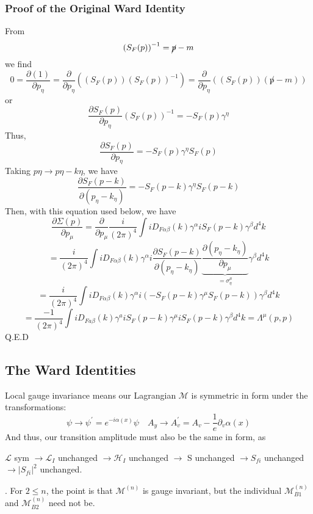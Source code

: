 \subsubsection{Proof of the Original Ward Identity}
From 
$$
\left(S_{F}(p)\right)^{-1}=\cancel{p}-m
$$
we find 
$$
0=\frac{\partial(1)}{\partial p_{\eta}}=\frac{\partial}{\partial p_{\eta}}\left(\left(S_{F}(p)\right)\left(S_{F}(p)\right)^{-1}\right)=\frac{\partial}{\partial p_{\eta}}\left(\left(S_{F}(p)\right)(\not p-m)\right)
$$
or
$$
\frac{\partial S_{F}(p)}{\partial p_{\eta}}\left(S_{F}(p)\right)^{-1}=-S_{F}(p) \gamma^{\eta}
$$
Thus,
$$\frac{\partial S_{F}(p)}{\partial p_{\eta}}=-S_{F}(p) \gamma^{\eta} S_{F}(p)$$
Taking $p \eta \rightarrow p \eta-k \eta$, we have
$$\frac{\partial S_{F}(p-k)}{\partial\left(p_{\eta}-k_{\eta}\right)}=-S_{F}(p-k) \gamma^{\eta} S_{F}(p-k)$$
Then, with this equation used below, we have
$$\frac{\partial \Sigma(p)}{\partial p_{\mu}}=\frac{\partial}{\partial p_{\mu}} \frac{i}{(2 \pi)^{4}} \int i D_{F \alpha \beta}(k) \gamma^{\alpha} i S_{F}(p-k) \gamma^{\beta} d^{4} k$$
$$=\frac{i}{(2 \pi)^{4}} \int i D_{F \alpha \beta}(k) \gamma^{\alpha} i \frac{\partial S_{F}(p-k)}{\partial\left(p_{\eta}-k_{\eta}\right)} \underbrace{\frac{\partial\left(p_{\eta}-k_{\eta}\right)}{\partial p_{\mu}}}_{=\sigma_{\eta}^{\mu}} \gamma^{\beta} d^{4} k$$
$$=\frac{i}{(2 \pi)^{4}} \int i D_{F \alpha \beta}(k) \gamma^{\alpha} i\left(-S_{F}(p-k) \gamma^{\mu} S_{F}(p-k)\right) \gamma^{\beta} d^{4} k$$
$$=\frac{-1}{(2 \pi)^{4}} \int i D_{F a \beta}(k) \gamma^{a} i S_{F}(p-k) \gamma^{\mu} i S_{F}(p-k) \gamma^{\beta} d^{4} k=\Lambda^{\mu}(p, p)$$
Q.E.D

\subsection{The Ward Identities}
Local gauge invariance means our Lagrangian $\mathcal{M}$ is symmetric in form under the transformations:
$$\psi \rightarrow \psi^{\prime}=e^{-i \alpha(x)} \psi \quad A_{y} \rightarrow A_{v}^{\prime}=A_{v}-\frac{1}{e} \partial_{v} \alpha(x)$$
And thus, our transition amplitude must also be the same in form, as

$\mathcal{L}$ sym $\rightarrow \mathcal{L}_{I}$ unchanged $\rightarrow \mathcal{H}_{I}$ unchanged $\rightarrow$ S unchanged $\rightarrow S_{f i}$ unchanged $\rightarrow\left|S_{f i}\right|^{2}$ unchanged.

. For $2\leq n$, the point is that $\mathcal{M}^{(n)}$ is gauge invariant, but the individual $\mathcal{M}_{B 1}^{(n)}$ and $\mathcal{M}_{B 2}^{(n)}$ need not be.

